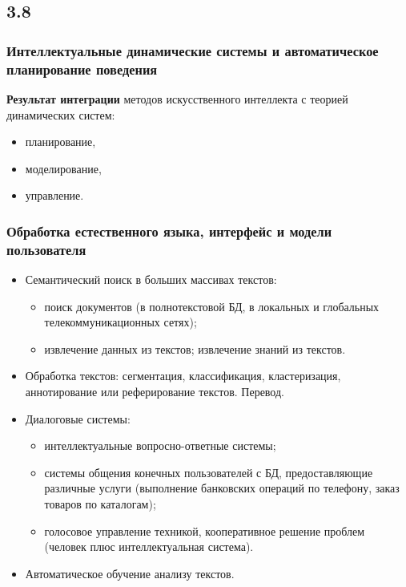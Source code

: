 \documentclass[default]{beamer}
\begin{document}
	\subsection{3.8}
	\begin{frame}
		\frametitle{Интеллектуальные динамические системы и автоматическое планирование поведения}
		\Large
		
		\textbf{Результат интеграции} методов искусственного интеллекта с теорией динамических систем:
		\begin{itemize}
			\item планирование,
			\item моделирование,
			\item управление.
		\end{itemize}
		
	\end{frame}

	\begin{frame}
		\frametitle{Обработка естественного языка, интерфейс и модели пользователя}
		\begin{itemize}
			\small
			\item Семантический поиск в больших массивах текстов:
			\begin{itemize}
				\footnotesize
				\item поиск документов (в полнотекстовой БД, в локальных и глобальных телекоммуникационных сетях);
				\item извлечение данных из текстов;
				извлечение знаний из текстов.
			\end{itemize}
			
			\item Обработка текстов: сегментация, классификация, кластеризация, аннотирование или реферирование текстов. Перевод. 
			\item Диалоговые системы: 
			\begin{itemize}
				\footnotesize
				\item интеллектуальные вопросно-ответные системы; 
				\item системы общения конечных пользователей с БД, предоставляющие  различные услуги (выполнение банковских операций по телефону, заказ товаров по каталогам); 
				\item голосовое управление техникой, кооперативное решение проблем (человек плюс интеллектуальная система).
			\end{itemize}
			
			\item Автоматическое обучение анализу текстов.
			
		\end{itemize}
		
	\end{frame}
\end{document}
